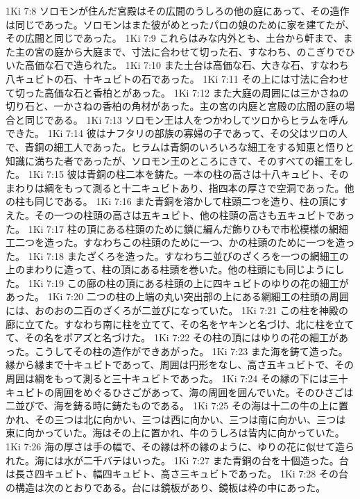 1Ki 7:8  ソロモンが住んだ宮殿はその広間のうしろの他の庭にあって、その造作は同じであった。ソロモンはまた彼がめとったパロの娘のために家を建てたが、その広間と同じであった。
1Ki 7:9  これらはみな内外とも、土台から軒まで、また主の宮の庭から大庭まで、寸法に合わせて切った石、すなわち、のこぎりでひいた高価な石で造られた。
1Ki 7:10  また土台は高価な石、大きな石、すなわち八キュビトの石、十キュビトの石であった。
1Ki 7:11  その上には寸法に合わせて切った高価な石と香柏とがあった。
1Ki 7:12  また大庭の周囲には三かさねの切り石と、一かさねの香柏の角材があった。主の宮の内庭と宮殿の広間の庭の場合と同じである。
1Ki 7:13  ソロモン王は人をつかわしてツロからヒラムを呼んできた。
1Ki 7:14  彼はナフタリの部族の寡婦の子であって、その父はツロの人で、青銅の細工人であった。ヒラムは青銅のいろいろな細工をする知恵と悟りと知識に満ちた者であったが、ソロモン王のところにきて、そのすべての細工をした。
1Ki 7:15  彼は青銅の柱二本を鋳た。一本の柱の高さは十八キュビト、そのまわりは綱をもって測ると十二キュビトあり、指四本の厚さで空洞であった。他の柱も同じである。
1Ki 7:16  また青銅を溶かして柱頭二つを造り、柱の頂にすえた。その一つの柱頭の高さは五キュビト、他の柱頭の高さも五キュビトであった。
1Ki 7:17  柱の頂にある柱頭のために鎖に編んだ飾りひもで市松模様の網細工二つを造った。すなわちこの柱頭のために一つ、かの柱頭のために一つを造った。
1Ki 7:18  またざくろを造った。すなわち二並びのざくろを一つの網細工の上のまわりに造って、柱の頂にある柱頭を巻いた。他の柱頭にも同じようにした。
1Ki 7:19  この廊の柱の頂にある柱頭の上に四キュビトのゆりの花の細工があった。
1Ki 7:20  二つの柱の上端の丸い突出部の上にある網細工の柱頭の周囲には、おのおの二百のざくろが二並びになっていた。
1Ki 7:21  この柱を神殿の廊に立てた。すなわち南に柱を立てて、その名をヤキンと名づけ、北に柱を立てて、その名をボアズと名づけた。
1Ki 7:22  その柱の頂にはゆりの花の細工があった。こうしてその柱の造作ができあがった。
1Ki 7:23  また海を鋳て造った。縁から縁まで十キュビトであって、周囲は円形をなし、高さ五キュビトで、その周囲は綱をもって測ると三十キュビトであった。
1Ki 7:24  その縁の下には三十キュビトの周囲をめぐるひさごがあって、海の周囲を囲んでいた。そのひさごは二並びで、海を鋳る時に鋳たものである。
1Ki 7:25  その海は十二の牛の上に置かれ、その三つは北に向かい、三つは西に向かい、三つは南に向かい、三つは東に向かっていた。海はその上に置かれ、牛のうしろは皆内に向かっていた。
1Ki 7:26  海の厚さは手の幅で、その縁は杯の縁のように、ゆりの花に似せて造られた。海には水が二千バテはいった。
1Ki 7:27  また青銅の台を十個造った。台は長さ四キュビト、幅四キュビト、高さ三キュビトであった。
1Ki 7:28  その台の構造は次のとおりである。台には鏡板があり、鏡板は枠の中にあった。
